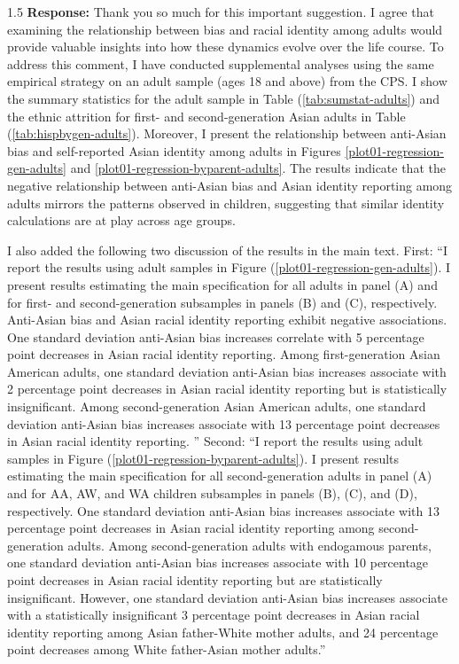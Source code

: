 \documentclass[12pt,english]{article}
\newcommand{\rrxspc}{1.5}
\begin{document}
\begin{refsection}
    \begin{spacing}{\rrxspc}
        \textbf{Response:} Thank you so much for this important suggestion. I agree that examining the relationship between bias and racial identity among adults would provide valuable insights into how these dynamics evolve over the life course. To address this comment, I have conducted supplemental analyses using the same empirical strategy on an adult sample (ages 18 and above) from the CPS. I show the summary statistics for the adult sample in Table (\ref{tab:sumstat-adults}) and the ethnic attrition for first- and second-generation Asian adults in Table (\ref{tab:hispbygen-adults}). Moreover, I present the relationship between anti-Asian bias and self-reported Asian identity among adults in Figures \ref{plot01-regression-gen-adults} and \ref{plot01-regression-byparent-adults}. The results indicate that the negative relationship between anti-Asian bias and Asian identity reporting among adults mirrors the patterns observed in children, suggesting that similar identity calculations are at play across age groups.

        I also added the following two discussion of the results in the main text. First: ``I report the results using adult samples in Figure (\ref{plot01-regression-gen-adults}). I present results estimating the main specification for all adults in panel (A) and for first- and second-generation subsamples in panels (B) and (C), respectively. Anti-Asian bias and Asian racial identity reporting exhibit negative associations. One standard deviation anti-Asian bias increases correlate with 5 percentage point decreases in Asian racial identity reporting. Among first-generation Asian American adults, one standard deviation anti-Asian bias increases associate with 2 percentage point decreases in Asian racial identity reporting but is statistically insignificant. Among second-generation Asian American adults, one standard deviation anti-Asian bias increases associate with 13 percentage point decreases in Asian racial identity reporting. '' Second: ``I report the results using adult samples in Figure (\ref{plot01-regression-byparent-adults}). I present results estimating the main specification for all second-generation adults in panel (A) and for AA, AW, and WA children subsamples in panels (B), (C), and (D), respectively. One standard deviation anti-Asian bias increases associate with 13 percentage point decreases in Asian racial identity reporting among second-generation adults. Among second-generation adults with endogamous parents, one standard deviation anti-Asian bias increases associate with 10 percentage point decreases in Asian racial identity reporting but are statistically insignificant. However, one standard deviation anti-Asian bias increases associate with a statistically insignificant 3 percentage point decreases in Asian racial identity reporting among Asian father-White mother adults, and 24 percentage point decreases among White father-Asian mother adults.''
    \end{spacing}


\end{refsection}
\end{document}
